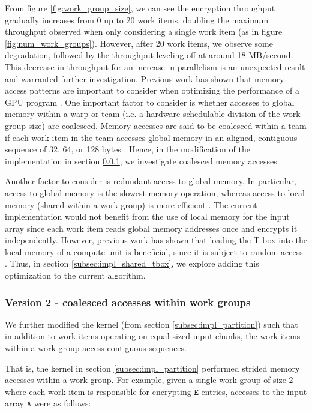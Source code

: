 \documentclass[conference,10pt]{IEEEtran}
\begin{document}
From figure \ref{fig:work_group_size}, we can see the encryption throughput gradually increases from 0 up 
to 20 work items, doubling the maximum throughput observed when only considering a single work item (as in 
figure \ref{fig:num_work_groups}).  However, after 20 work items, we observe some degradation, followed by 
the throughput leveling off at around 18 MB/second.  This decrease in throughput for an increase in 
parallelism is an unexpected result and warranted further investigation.  Previous work has shown that 
memory access patterns are important to consider when optimizing the performance of a GPU program 
\cite{gpu_mem}.  One important factor to consider is whether accesses to global memory within a warp 
\cite{gpu_mem} or team \cite{opencl_guide} (i.e. a hardware schedulable division of the work group size) 
are coalesced.  Memory accesses are said to be coalesced within a team if each work item in the team 
accesses global memory in an aligned, contiguous sequence of 32, 64, or 128 bytes \cite{nvidia_opencl}.  
Hence, in the modification of the implementation in section \ref{subsec:impl_coalesce}, we investigate 
coalesced memory accesses.  

Another factor to consider is redundant access to global memory.  In particular, access to global memory is 
the slowest memory operation, whereas access to local memory (shared within a work group) is more efficient 
\cite{opencl_guide}.  The current implementation would not benefit from the use of local memory for the 
input array since each work item reads global memory addresses once and encrypts it independently.  
However, previous work has shown that loading the T-box into the local memory of a compute unit is 
beneficial, since it is subject to random access \cite{shared_tbox}.  Thus, in section 
\ref{subsec:impl_shared_tbox}, we explore adding this optimization to the current algorithm.

\subsubsection{Version 2 - coalesced accesses within work groups}
\label{subsec:impl_coalesce}

We further modified the kernel (from section \ref{subsec:impl_partition}) such that in addition to work 
items operating on equal sized input chunks, the work items within a work group access contiguous 
sequences.  

That is, the kernel in section \ref{subsec:impl_partition} performed strided memory accesses \cite{gpu_mem} 
within a work group.  For example, given a single work group of size 2 where each work item is responsible 
for encrypting $\mathtt{E}$ entries, accesses to the input array $\mathtt{A}$ were as follows:
\end{document}

